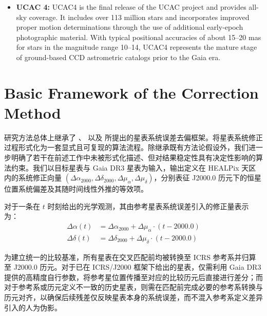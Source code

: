 \documentclass{aastex701}
\begin{document}
\begin{itemize}
    \item \textbf{UCAC 4:} \label{subsubsec:ucac4} UCAC4 is the final release of the UCAC project and provides all-sky coverage. It includes over 113 million stars and incorporates improved proper motion determinations through the use of additional early-epoch photographic material. With typical positional accuracies of about 15–20 mas for stars in the magnitude range 10–14, UCAC4 represents the mature stage of ground-based CCD astrometric catalogs prior to the Gaia era.
\end{itemize}

\section{Basic Framework of the Correction Method} \label{sec:methods}

研究方法总体上继承了 \citet{Chesley2010Icarus}、\citet{Farnocchia2015Icarus} 以及\citet{Eggl2020Icarus} 所提出的星表系统误差去偏框架。将星表系统修正过程形式化为一套显式且可复现的算法流程。除继承既有方法论假设外，我们进一步明确了若干在前述工作中未被形式化描述、但对结果稳定性具有决定性影响的算法约束。我们以目标星表与 Gaia DR3 星表为输入，输出定义在 HEALPix 天区内的系统修正向量 $(\Delta\alpha_{2000}, \Delta\delta_{2000}, \Delta\mu_{\alpha}, \Delta\mu_{\delta})$，分别表征 J2000.0 历元下的恒星位置系统偏差及其随时间线性外推的等效项。

对于一条在 $t$ 时刻给出的光学观测，其由参考星表系统误差引入的修正量表示为：
\begin{equation}
\begin{split}
\Delta\alpha(t) &= \Delta\alpha_{2000} + \Delta\mu_{\alpha} \cdot (t - 2000.0)\\
\Delta\delta(t) &= \Delta\delta_{2000} + \Delta\mu_{\delta} \cdot (t - 2000.0)
\end{split}
\end{equation}

为建立统一的比较基准，所有星表在交叉匹配前均被转换至 ICRS 参考系并归算至 J2000.0 历元。对于已在 ICRS/J2000 框架下给出的星表，仅需利用 Gaia DR3 提供的高精度自行参数，将参考星位置传播至对应的比较历元后直接进行差分；而对于参考系或历元定义不一致的历史星表，则需在匹配前完成必要的参考系转换与历元对齐，以确保后续残差仅反映星表本身的系统误差，而不混入参考系定义差异引入的人为伪影。
\end{document}
